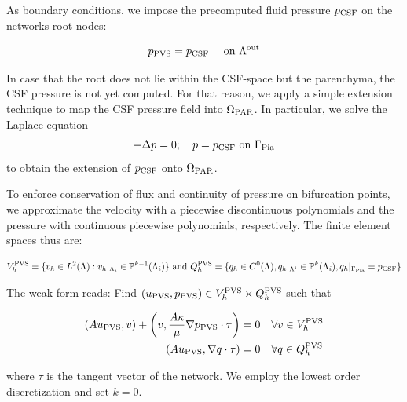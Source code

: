 \documentclass[fleqn,10pt]{wlscirep}
\begin{document}
As boundary conditions, we impose the precomputed fluid pressure $p_{\rm CSF}$ on the networks root nodes:

\begin{equation}
    p_{\rm PVS} = p_{\rm CSF} \quad \text{ on } \Lambda^{\rm out}
\end{equation}

In case that the root does not lie within the CSF-space but the parenchyma, the CSF pressure is not yet computed. For that reason, we apply a simple extension technique to map the CSF pressure field into $\Omega_{\rm PAR}$.
In particular, we solve the Laplace equation
\begin{equation}
    - \Delta p = 0; \quad p = p_{\rm CSF} \text{ on } \Gamma_{\rm Pia}
\end{equation}
to obtain the extension of $p_{\rm CSF}$ onto $\Omega_{\rm PAR}$.

To enforce conservation of flux and continuity of pressure on bifurcation points, we approximate the velocity with a piecewise discontinuous polynomials and the pressure with continuous piecewise polynomials, respectively. The finite element spaces thus are:

\begin{align}
   V_h^{\rm PVS} = \{v_h \in L^2(\Lambda): v_h \vert_{\Lambda_i} \in
   \mathbb{P}^{k -1}(\Lambda_i)\} \text{ and }
   Q_h^{\rm PVS} = \{ q_h \in C^0(\Lambda),  q_h \vert_{\Lambda^i} \in \mathbb{P}^k(\Lambda_i), q_h \vert_{\Gamma_{\rm Pia}} = p_{\rm CSF} \}
\end{align}

The weak form reads: Find $(u_{\rm PVS}, p_{\rm PVS}) \in V_h^{\rm PVS} \times Q_h^{\rm PVS}$ such that

\begin{align}
(A u_{\rm PVS}, v) + \left(v, \frac{A \kappa}{\mu} \nabla p_{\rm PVS} \cdot \tau \right) &= 0 \quad \forall v \in V_h^{\rm PVS} \\
(A u_{\rm PVS} , \nabla q \cdot \tau) &= 0 \quad  \forall q \in  Q_h^{\rm PVS}
\end{align}

where $\tau$ is the tangent vector of the network. We employ the lowest order discretization and set $k=0$.
\end{document}
